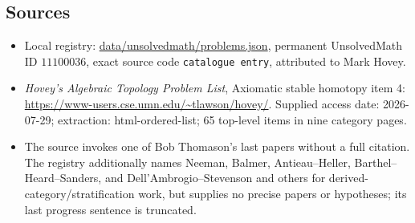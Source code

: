 \documentclass[11pt]{article}
\begin{document}
\subsection{Sources}
\begin{itemize}
\item Local registry: \url{data/unsolvedmath/problems.json}, permanent UnsolvedMath ID $11100036$, exact source code \texttt{catalogue entry}, attributed to Mark Hovey.
\item \emph{Hovey's Algebraic Topology Problem List}, Axiomatic stable homotopy item 4: \url{https://www-users.cse.umn.edu/~tlawson/hovey/}. Supplied access date: 2026-07-29; extraction: html-ordered-list; 65 top-level items in nine category pages.
\item The source invokes one of Bob Thomason's last papers without a full citation. The registry additionally names Neeman, Balmer, Antieau--Heller, Barthel--Heard--Sanders, and Dell'Ambrogio--Stevenson and others for derived-category/stratification work, but supplies no precise papers or hypotheses; its last progress sentence is truncated.
\end{itemize}
\end{document}
